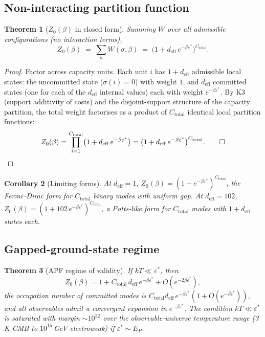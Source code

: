 \documentclass[11pt,a4paper]{article}
\newtheorem{theorem}{Theorem}[section]
\newtheorem{corollary}[theorem]{Corollary}
\theoremstyle{definition}
\newcommand{\epsstar}{\varepsilon^{\ast}}
\newcommand{\Ctot}{C_{\mathrm{total}}}
\newcommand{\deff}{d_{\mathrm{eff}}}
\begin{document}
\subsection{Non-interacting partition function}

\begin{theorem}[$Z_0(\beta)$ in closed form]
\label{thm:Z0}
Summing $W$ over all admissible configurations (no interaction terms),
\[
\boxed{
  Z_0(\beta) \;=\; \sum_{\sigma} W(\sigma,\beta) \;=\; \bigl(1 + \deff\,e^{-\beta\epsstar}\bigr)^{\Ctot}.
}
\]
\end{theorem}

\begin{proof}
Factor across capacity units.  Each unit $i$ has $1+\deff$ admissible local states: the uncommitted state ($\sigma(i)=0$) with weight $1$, and $\deff$ committed states (one for each of the $\deff$ internal values) each with weight $e^{-\beta\epsstar}$.  By K3 (support additivity of costs) and the disjoint-support structure of the capacity partition, the total weight factorises as a product of $\Ctot$ identical local partition functions:
\[
  Z_0(\beta) = \prod_{i=1}^{\Ctot}\bigl(1 + \deff\,e^{-\beta\epsstar}\bigr) = \bigl(1+\deff\,e^{-\beta\epsstar}\bigr)^{\Ctot}.\qed
\]
\end{proof}

\begin{corollary}[Limiting forms]
\label{cor:Z0limits}
At $\deff=1$, $Z_0(\beta)=(1+e^{-\beta\epsstar})^{\Ctot}$, the Fermi--Dirac form for $\Ctot$ binary modes with uniform gap.  At $\deff=102$, $Z_0(\beta)=(1+102\,e^{-\beta\epsstar})^{\Ctot}$, a Potts-like form for $\Ctot$ modes with $1+\deff$ states each.
\end{corollary}

\subsection{Gapped-ground-state regime}

\begin{theorem}[APF regime of validity]
\label{thm:gap}
If $kT \ll \epsstar$, then
\[
  Z_0(\beta) = 1 + \Ctot\,\deff\,e^{-\beta\epsstar} + O(e^{-2\beta\epsstar}),
\]
the occupation number of committed modes is $\Ctot\deff\,e^{-\beta\epsstar}(1+O(e^{-\beta\epsstar}))$, and all observables admit a convergent expansion in $e^{-\beta\epsstar}$.  The condition $kT\ll\epsstar$ is saturated with margin $\sim 10^{32}$ over the observable-universe temperature range (3\,K CMB to $10^{15}$\,GeV electroweak) if $\epsstar\sim E_P$.
\end{theorem}
\end{document}
